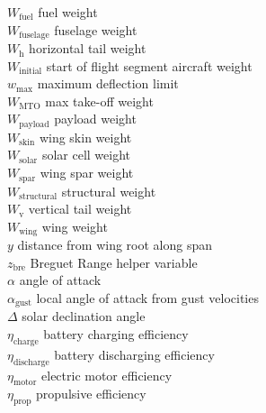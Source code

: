 \begin{multicols}{2}
\begin{tabbing}
$W_{\text{fuel}}$ \> fuel weight \\ %
$W_{\text{fuselage}}$ \> fuselage weight \\ %
$W_{\text{h}}$ \> horizontal tail weight \\ %
$W_{\text{initial}}$ \> start of flight segment aircraft weight \\ %
$w_{\text{max}}$ \> maximum deflection limit \\ %
$W_{\text{MTO}}$\> max take-off weight \\ %
$W_{\text{payload}}$ \> payload weight \\ %
$W_{\text{skin}}$ \> wing skin weight \\ %
$W_{\text{solar}}$ \> solar cell weight \\ %
$W_{\text{spar}}$ \> wing spar weight \\ %
$W_{\text{structural}}$ \> structural weight \\ %
$W_{\text{v}}$ \> vertical tail weight \\ %
$W_{\text{wing}}$ \> wing weight \\ %
$y$ \> distance from wing root along span \\ %
$z_{\text{bre}}$ \> Breguet Range helper variable \\
$\alpha$ \> angle of attack \\
$\alpha_{\text{gust}}$ \> local angle of attack from gust velocities \\ %
$\Delta$ \> solar declination angle \\
$\eta_{\text{charge}}$ \> battery charging efficiency \\
$\eta_{\text{discharge}}$ \> battery discharging efficiency \\
$\eta_{\text{motor}}$ \> electric motor efficiency \\
$\eta_{\text{prop}}$ \> propulsive efficiency \\

\end{tabbing}
\end{multicols}
